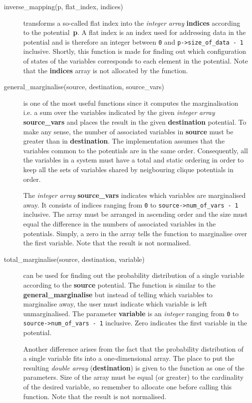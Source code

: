 \documentclass[12pt,a4paper]{report}
\begin{document}
\begin{description}
\item[inverse\_mapping(p, flat\_index, indices)] transforms a
so-called flat index into the {\it integer array} \textbf{indices} according 
to the potential~\textbf{p}. A flat index is an index used for addressing
data in the potential and is therefore an integer between \verb+0+ and 
\verb+p->size_of_data - 1+ inclusive. Shortly, this function is made for
finding out which configuration of states of the variables corresponds
to each element in the potential. Note that the \textbf{indices} array 
is not allocated by the function.

\item[general\_marginalise(source, destination, source\_vars)] is one
of the most useful functions since it computes the marginalisation
i.e. a sum over the variables indicated by the given {\it integer
array} \textbf{source\_vars} and places the result in the given
\textbf{destination} potential. To make any sense, the number of
associated variables in \textbf{source} must be greater than in
\textbf{destination}. The implementation assumes that the variables 
common to the potentials are in the same order. Consequently, all the 
variables in a system must have a total and static ordering in
order to keep all the sets of variables shared by neigbouring clique
potentials in order.

The {\it integer array} \textbf{source\_vars} indicates which
variables are marginalised away. It consists of indices ranging from
\verb+0+ to \verb+source->num_of_vars - 1+ inclusive. The array
must be arranged in ascending order and the size must equal the
difference in the numbers of associated variables in the potentials. 
Simply, a zero in the array tells the function to marginalise over the 
first variable. Note that the result is not normalised.

\item[total\_marginalise(source, destination, variable)] can be used
for finding out the probability distribution of a single variable
according to the \textbf{source} potential. The function is similar to
the \textbf{general\_marginalise} but instead of telling which
variables to marginalise away, the user must indicate which
variable is left unmarginalised. The parameter \textbf{variable} is 
an {\it integer} ranging from \verb+0+ to
\verb+source->num_of_vars - 1+ inclusive. Zero indicates the first
variable in the potential.

Another difference arises from the fact that the probability 
distribution of a single variable fits into a one-dimensional array. 
The place to put the resulting {\it double array} 
(\textbf{destination}) is given to the function as one of the
parameters. Size of the array must be equal (or greater) to the
cardinality of the desired variable, so remember to allocate one
before calling this function. Note that the result is not normalised.


\end{description}
\end{document}
